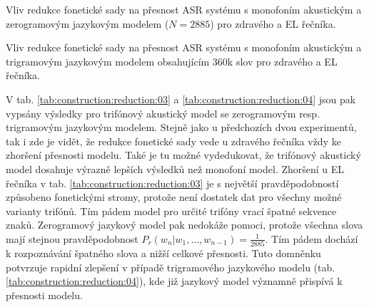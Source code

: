 \begin{table}[htpb]
  \centering
  \def\arraystretch{1.5}
  \caption{Vliv redukce fonetické sady na přesnost ASR systému s monofoním akustickým a zerogramovým jazykovým modelem ($N=2885$) pro zdravého a EL řečníka.}
  \label{tab:construction:reduction:01}
\end{table}

\begin{table}[htpb]
  \centering
  \def\arraystretch{1.5}
  \caption{Vliv redukce fonetické sady na přesnost ASR systému s monofoním akustickým a trigramovým jazykovým modelem obsahujícím 360k slov pro zdravého a EL řečníka.}
  \label{tab:construction:reduction:02}
\end{table}

V tab. \ref{tab:construction:reduction:03} a \ref{tab:construction:reduction:04} jsou pak vypsány výsledky pro trifónový akustický model se zerogramovým resp. trigramovým jazykovým modelem. Stejně jako u předchozích dvou experimentů, tak i zde je vidět, že redukce fonetické sady vede u zdravého řečníka vždy ke zhoršení přesnosti modelu. Také je tu možné vydedukovat, že trifónový akustický model dosahuje výrazně lepších výsledků než monofoní model. Zhoršení u EL řečníka v tab. \ref{tab:construction:reduction:03} je s největší pravděpodobností způsobeno fonetickými stromy, protože není dostatek dat pro všechny možné varianty trifónů. Tím pádem model pro určité trifóny vrací špatné sekvence znaků. Zerogramový jazykový model pak nedokáže pomoci, protože všechna slova mají stejnou pravděpodobnost $P_r(w_n|w_1,\dots,w_{n-1}) = \frac{1}{2885}$. Tím pádem dochází k rozpoznávání špatného slova a nižší celkové přesnosti. Tuto domněnku potvrzuje rapidní zlepšení v případě trigramového jazykového modelu (tab. \ref{tab:construction:reduction:04}), kde již jazykový model významně přispívá k přesnosti modelu.

